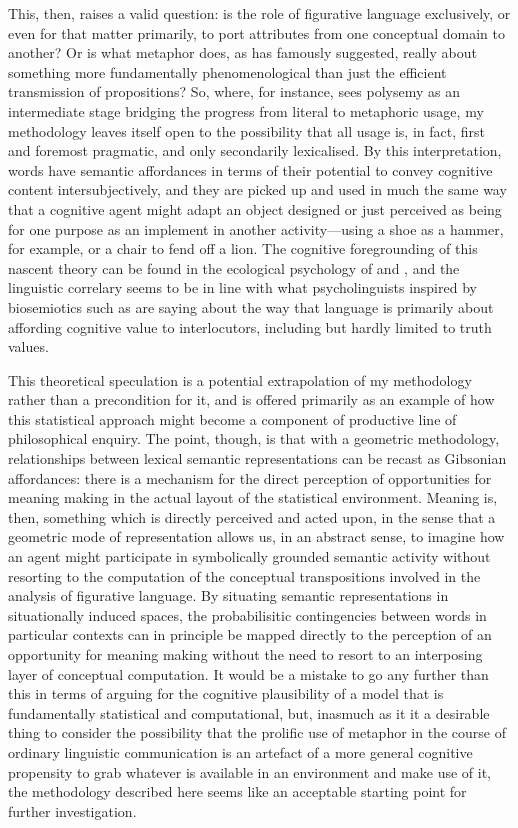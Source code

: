 This, then, raises a valid question: is the role of figurative language exclusively, or even for that matter primarily, to port attributes from one conceptual domain to another?  Or is what metaphor does, as \cite{Davidson1978} has famously suggested, really about something more fundamentally phenomenological than just the efficient transmission of propositions?  So, where, for instance, \cite{Sweetser1990} sees polysemy as an intermediate stage bridging the progress from literal to metaphoric usage, my methodology leaves itself open to the possibility that all usage is, in fact, first and foremost pragmatic, and only secondarily lexicalised.  By this interpretation, words have semantic affordances in terms of their potential to convey cognitive content intersubjectively, and they are picked up and used in much the same way that a cognitive agent might adapt an object designed or just perceived as being for one purpose as an implement in another activity---using a shoe as a hammer, for example, or a chair to fend off a lion.  The cognitive foregrounding of this nascent theory can be found in the ecological psychology of \cite{Bateson1972} and \cite{Gibson1979}, and the linguistic correlary seems to be in line with what psycholinguists inspired by biosemiotics such as \cite{RaczasekLeonardiEA2015} are saying about the way that language is primarily about affording cognitive value to interlocutors, including but hardly limited to truth values.

This theoretical speculation is a potential extrapolation of my methodology rather than a precondition for it, and is offered primarily as an example of how this statistical approach might become a component of productive line of philosophical enquiry.  The point, though, is that with a geometric methodology, relationships between lexical semantic representations can be recast as Gibsonian affordances: there is a mechanism for the direct perception of opportunities for meaning making in the actual layout of the statistical environment.  Meaning is, then, something which is directly perceived and acted upon, in the sense that a geometric mode of representation allows us, in an abstract sense, to imagine how an agent might participate in symbolically grounded semantic activity without resorting to the computation of the conceptual transpositions involved in the analysis of figurative language.  By situating semantic representations in situationally induced spaces, the probabilisitic contingencies between words in particular contexts can in principle be mapped directly to the perception of an opportunity for meaning making without the need to resort to an interposing layer of conceptual computation.  It would be a mistake to go any further than this in terms of arguing for the cognitive plausibility of a model that is fundamentally statistical and computational, but, inasmuch as it it a desirable thing to consider the possibility that the prolific use of metaphor in the course of ordinary linguistic communication is an artefact of a more general cognitive propensity to grab whatever is available in an environment and make use of it, the methodology described here seems like an acceptable starting point for further investigation.

